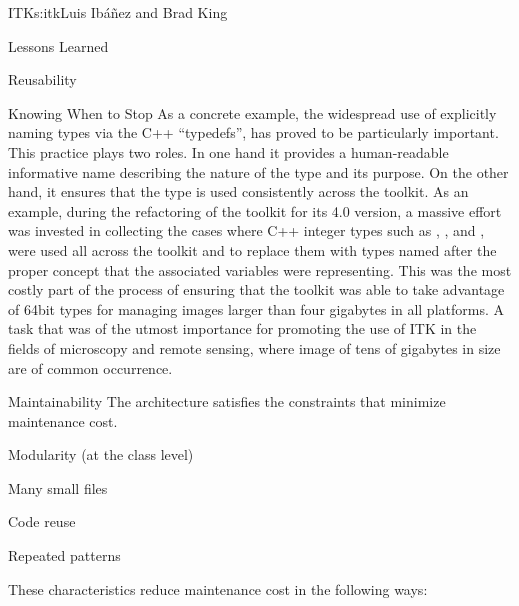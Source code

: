 \begin{aosachapter}{ITK}{s:itk}{Luis Ib\'{a}\~{n}ez and Brad King}
\begin{aosasect1}{Lessons Learned}
\begin{aosasect2}{Reusability}
\begin{aosasect3}{Knowing When to Stop}
As a concrete example, the widespread use of explicitly naming types via the C++
``typedefs'', has proved to be particularly important. This practice plays two
roles. In one hand it provides a human-readable informative name describing the
nature of the type and its purpose. On the other hand, it ensures that the type
is used consistently across the toolkit. As an example, during the refactoring
of the toolkit for its 4.0 version, a massive effort was invested in collecting
the cases where C++ integer types such as , ,
 and , were used all across the toolkit and to
replace them with types named after the proper concept that the associated
variables were representing. This was the most costly part of the process of
ensuring that the toolkit was able to take advantage of 64bit types for
managing images larger than four gigabytes in all platforms. A task that was of the
utmost importance for promoting the use of ITK in the fields of microscopy and
remote sensing, where image of tens of gigabytes in size are of common
occurrence.
\end{aosasect3}

\end{aosasect2}

\begin{aosasect2}{Maintainability}
The architecture satisfies the constraints that minimize maintenance cost.
\begin{aosaitemize}
\item Modularity (at the class level)
\item Many small files 
\item Code reuse
\item Repeated patterns
\end{aosaitemize}
\end{aosasect2}

\noindent These characteristics reduce maintenance cost in the following ways:


\end{aosasect1}
\end{aosachapter}
